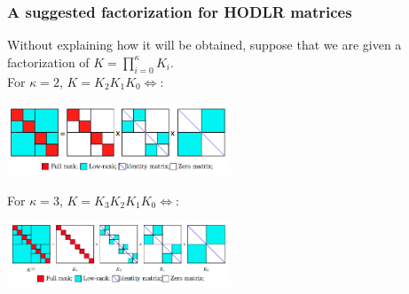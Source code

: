 \documentclass{beamer}
\begin{document}
\begin{frame}
\frametitle{A suggested factorization for HODLR matrices}
Without explaining how it will be obtained, suppose that we are given a factorization of $K = \prod_{i=0}^\kappa K_i$. \\
For $\kappa=2$, $K = K_2 K_1 K_0 \Leftrightarrow$:
\begin{center}
 \includegraphics[width=0.5\textwidth]{fig2.png}\end{center}
For $\kappa=3$, $K =K_3 K_2 K_1 K_0 \Leftrightarrow$:
\begin{center}
 \includegraphics[width=0.5\textwidth]{fig3.png}\end{center}
 \end{frame}
\end{document}
